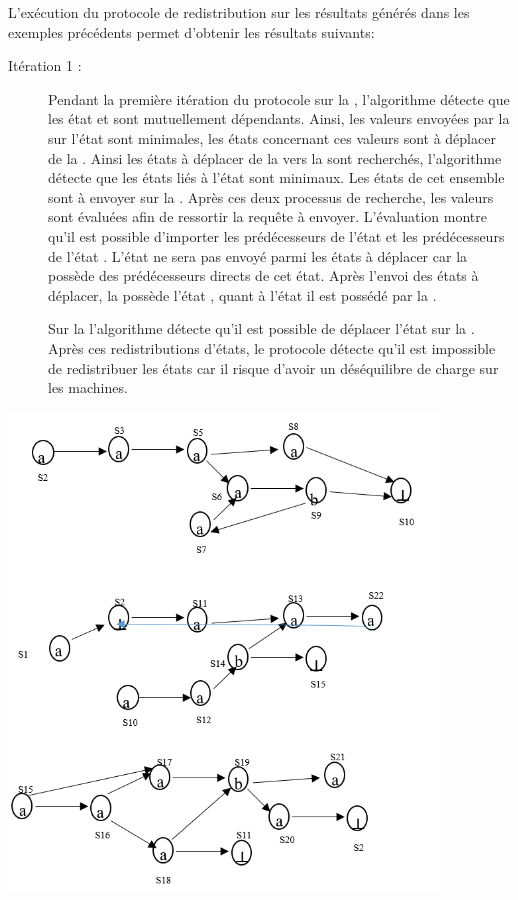 \begin{Exemple}\label{ea5}
L'exécution du protocole de redistribution sur les résultats générés dans les exemples précédents permet d'obtenir  les résultats suivants:

\nopagebreak
\begin{description}
\item[Itération 1 :] Pendant la première itération du protocole sur la \mone{}, l'algorithme détecte que les état  et  sont mutuellement dépendants. Ainsi, les valeurs envoyées par la \mtwo{} sur l'état  sont minimales, les états concernant ces valeurs sont à déplacer de la \mtwo{}. Ainsi les états à déplacer de la \mone{} vers la \mtwo{} sont recherchés, l'algorithme détecte que les états liés à l'état  sont minimaux. Les états de cet ensemble sont à envoyer sur la \mtwo{}. Après ces deux processus de recherche, les valeurs sont évaluées afin de ressortir la requête à envoyer. L'évaluation montre qu'il est possible d'importer les prédécesseurs de l'état  et les prédécesseurs de  l'état .
L'état  ne sera pas envoyé parmi les états à déplacer car la \mtree{} possède des prédécesseurs directs de cet état. Après l'envoi des états à déplacer, la \mone{} possède l'état , quant à l'état  il est possédé par la \mtwo{}.


Sur la \mtree{} l'algorithme détecte qu'il est possible de déplacer l'état  sur la \mtwo{}.
   Après ces redistributions d'états, le protocole détecte qu'il est impossible de redistribuer les états car il risque d'avoir un déséquilibre de charge sur les machines.
   
\end{description}
\centering
	\includegraphics[height=5in]{img/Rskd.png}
	
\end{Exemple}